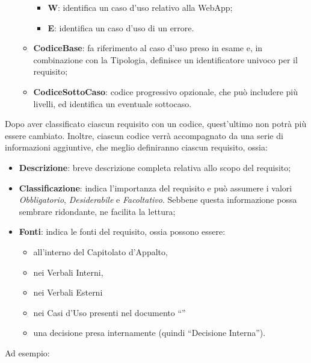 \begin{itemize}
\begin{itemize}
		\begin{itemize}
			\item \textbf{W}: identifica un caso d'uso relativo alla WebApp;
			\item \textbf{E}: identifica un caso d'uso di un errore.
		\end{itemize}
	\item \textbf{CodiceBase}: fa riferimento al caso d’uso preso in esame e, in combinazione con la Tipologia, definisce un identificatore univoco per il requisito;
	\item \textbf{CodiceSottoCaso}: codice progressivo opzionale, che può includere più livelli, ed identifica un eventuale sottocaso.
\end{itemize}
\end{itemize}

Dopo aver classificato ciascun requisito con un codice, quest’ultimo non potrà più essere cambiato.
Inoltre, ciascun codice verrà accompagnato da una serie di informazioni aggiuntive, che meglio definiranno ciascun requisito, ossia:

\begin{itemize}
	\item \textbf{Descrizione}: breve descrizione completa relativa allo scopo del requisito;
	\item \textbf{Classificazione}: indica l’importanza del requisito e può assumere i valori \textit{Obbligatorio}, \textit{Desiderabile} e \textit{Facoltativo}. Sebbene questa informazione possa sembrare ridondante, ne facilita la lettura;
	\item \textbf{Fonti}: indica le fonti del requisito, ossia possono essere:
	\begin{itemize}
		\item all'interno del Capitolato d’Appalto, 
		\item nei Verbali Interni, 
		\item nei Verbali Esterni 
		\item nei Casi d’Uso presenti nel documento “\AdR”
		\item una decisione presa internamente (quindi “Decisione Interna”).
	\end{itemize}	 
\end{itemize}

Ad esempio:\\


